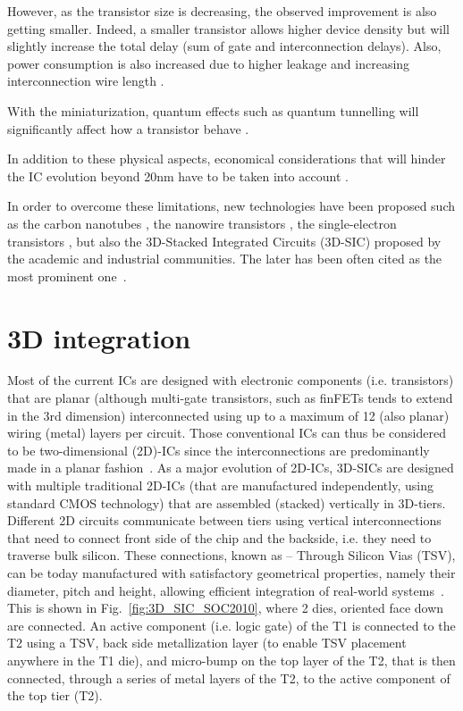 However, as the transistor size is decreasing, the observed improvement is also getting smaller. Indeed, a smaller transistor allows higher device density but will slightly increase the total delay (sum of gate and interconnection delays). Also, power consumption is also increased due to higher leakage and increasing interconnection wire length \cite{5227192}.

With the miniaturization, quantum effects such as quantum tunnelling will significantly affect how a transistor behave \cite{1240081}.

In addition to these physical aspects, economical considerations that will hinder the IC evolution beyond 20nm have to be taken into account \cite{5227192,PFF10}.

In order to overcome these limitations, new technologies have been proposed such as the carbon nanotubes \cite{tans1998room}, the nanowire transistors \cite{doi:10.1021/nl025875l}, the single-electron transistors \cite{citeulike:4194929}, but also the 3D-Stacked Integrated Circuits (3D-SIC) proposed by the academic and industrial communities. The later has been often cited as the most prominent one~\cite{659500}.

\section{3D integration}

Most of the current ICs are designed with electronic components (i.e. transistors) that are planar (although multi-gate transistors, such as finFETs tends to extend in the 3rd dimension) interconnected using up to a maximum of 12 (also planar) wiring (metal) layers per circuit. Those conventional ICs can thus be considered to be two-dimensional (2D)-ICs since the interconnections are predominantly made in a planar fashion~\cite{1393404,fujitsu08}. As a major evolution of 2D-ICs, 3D-SICs are designed with multiple traditional 2D-ICs (that are manufactured independently, using standard CMOS technology) that are assembled (stacked) vertically in 3D-tiers. Different 2D circuits communicate between tiers using vertical interconnections that need to connect front side of the chip and the backside, i.e. they need to traverse bulk silicon. These connections, known as \--- Through Silicon Vias (TSV), can be today manufactured with satisfactory geometrical properties, namely their diameter, pitch and height, allowing efficient integration of real-world systems~\cite{1705326,5746413}. This is shown in Fig.~\ref{fig:3D_SIC_SOC2010}, where 2 dies, oriented face down are connected. An active component (i.e. logic gate) of the T1 is connected to the T2 using a TSV, back side metallization layer (to enable TSV placement anywhere in the T1 die), and micro-bump on the top layer of the T2, that is then connected, through a series of metal layers of the T2, to the active component of the top tier (T2).

